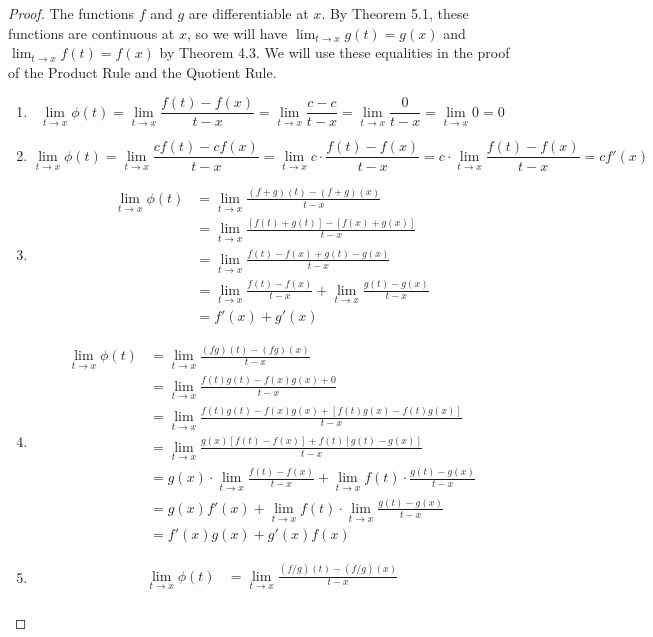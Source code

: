 \documentclass{article}
\theoremstyle{definition}
\begin{document}
	\begin{proof} The functions $ f $ and $ g $ are differentiable at $ x $. By Theorem 5.1, these functions are continuous at $ x $, so we will have $ \lim_{t\to x}g(t)=g(x) $ and $ \lim_{t\to x}f(t)=f(x) $ by Theorem 4.3. We will use these equalities in the proof of the Product Rule and the Quotient Rule.
		\begin{enumerate}
			\item $$\lim\limits_{t\to x}\phi(t)=\lim\limits_{t\to x}\frac{f(t)-f(x)}{t-x}=\lim\limits_{t\to x}\frac{c-c}{t-x}=\lim\limits_{t\to x}\frac{0}{t-x}=\lim\limits_{t\to x}0=0 $$
			\item $$\lim\limits_{t\to x}\phi(t)=\lim\limits_{t\to x}\frac{cf(t)-cf(x)}{t-x}=\lim\limits_{t\to x}c\cdot\frac{f(t)-f(x)}{t-x}=c\cdot\lim\limits_{t\to x}\frac{f(t)-f(x)}{t-x}=cf'(x) $$
			\item \begin{align*}
				\lim\limits_{t\to x}\phi(t)&=\lim\limits_{t\to x}\frac{(f+g)(t)-(f+g)(x)}{t-x}\\&=\lim\limits_{t\to x}\frac{[f(t)+g(t)]-[f(x)+g(x)]}{t-x}\\
				&=\lim\limits_{t\to x}\frac{f(t)-f(x)+g(t)-g(x)}{t-x}\\
				&=\lim\limits_{t\to x}\frac{f(t)-f(x)}{t-x}+\lim\limits_{t\to x}\frac{g(t)-g(x)}{t-x}\\
				&=f'(x)+g'(x)
			\end{align*}
			\item \begin{align*}
				\lim\limits_{t\to x}\phi(t)&=\lim\limits_{t\to x}\frac{(fg)(t)-(fg)(x)}{t-x}\\&=\lim\limits_{t\to x}\frac{f(t)g(t)-f(x)g(x)+0}{t-x}\\
				&=\lim\limits_{t\to x}\frac{f(t)g(t)-f(x)g(x)+[f(t)g(x)-f(t)g(x)]}{t-x}\\
				&=\lim\limits_{t\to x}\frac{g(x)[f(t)-f(x)]+f(t)[g(t)-g(x)]}{t-x}\\
				&=g(x)\cdot\lim\limits_{t\to x}\frac{f(t)-f(x)}{t-x}+\lim\limits_{t\to x}f(t)\cdot\frac{g(t)-g(x)}{t-x}\\&=g(x)f'(x)+\lim\limits_{t\to x}f(t)\cdot \lim\limits_{t\to x}\frac{g(t)-g(x)}{t-x}\\&=f'(x)g(x)+g'(x)f(x)
			\end{align*}
			\item 
			\begin{align*}
				\lim\limits_{t\to x}\phi(t)&=\lim\limits_{t\to x}\frac{(f/g)(t)-(f/g)(x)}{t-x}\\

\end{align*}
\end{enumerate}
\end{proof}
\end{document}
